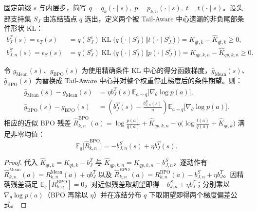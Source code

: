 \documentclass[lang=cn,scheme=chinese,openany]{elegantbook}
\newcommand{\E}{\mathbb E}
\newcommand{\KL}{\operatorname{KL}}
\begin{document}
固定前缀 $s$ 与内层步，简写 $q=q_k(\cdot\mid s),\; p=p_{k,n}(\cdot\mid s),\; t=t(\cdot\mid s)$。设头部支持集 $S_J$ 由冻结锚点 $q$ 选出，定义两个被 Tail-Aware 中心遗漏的非负尾部条件形状 KL：
\begin{align}
 b_J^T(s)=\epsilon_T(s)&=q(S_J^c)\KL\bigl(q(\cdot\mid S_J^c)\Vert t(\cdot\mid S_J^c)\bigr)=K_{qt,k}-\widehat K_{qt,k}\ge 0,\\
 b_{J,n}^S(s)=\epsilon_S(s)&=q(S_J^c)\KL\bigl(q(\cdot\mid S_J^c)\Vert p(\cdot\mid S_J^c)\bigr)=K_{qp,k,n}-\widehat K_{qp,k,n}\ge 0.
\end{align}

\begin{theorem}
\label{thm:ch2-ta-center-gradient-bias}
令 $g_{\mathrm{Mean}}(s)$、$g_{\mathrm{BPO}}(s)$ 为使用精确条件 KL 中心的得分函数梯度，$\widehat g_{\mathrm{Mean}}(s)$、$\widehat g_{\mathrm{BPO}}(s)$ 为替换成 Tail-Aware 中心并对整个权重停止梯度后的条件期望。则：
\begin{align}
 \widehat g_{\mathrm{Mean}}(s)-g_{\mathrm{Mean}}(s)
 &=\eta b_J^T(s)\mathbb E_{a\sim q}\bigl[\nabla_\theta\log p(a)\bigr],\\
 \widehat g_{\mathrm{BPO}}(s)-g_{\mathrm{BPO}}(s)
 &=\left(b_J^T(s)-\frac{b_{J,n}^S(s)}{\eta}\right)
   \mathbb E_{a\sim q}\bigl[\nabla_\theta\log p(a)\bigr].
\end{align}
相应的近似 BPO 残差 $\widehat R_{k,n}^{\mathrm{BPO}}(a)=\log\frac{p(a)}{q(a)}+\widehat K_{qp,k,n}-\eta\bigl(\log\frac{t(a)}{q(a)}+\widehat K_{qt,k}\bigr)$ 满足非零均值：
\begin{equation}
 \mathbb E_q\bigl[\widehat R_{k,n}^{\mathrm{BPO}}\bigr]=-b_{J,n}^S(s)+\eta b_J^T(s).
\end{equation}
\end{theorem}
\begin{proof}
代入 $\widehat K_{qt,k}=K_{qt,k}-b_J^T$ 与 $\widehat K_{qp,k,n}=K_{qp,k,n}-b_{J,n}^S$，逐动作有 $\widehat R_{k,n}^{\mathrm{Mean}}(a)=R_{k,n}^{\mathrm{Mean}}(a)+\eta b_J^T$ 以及 $\widehat R_{k,n}^{\mathrm{BPO}}(a)=R_{k,n}^{\mathrm{BPO}}(a)-b_{J,n}^S+\eta b_J^T$。因精确残差满足 $\E_q[R_{k,n}^{\mathrm{BPO}}]=0$，对近似残差取期望即得 $-b_{J,n}^S+\eta b_J^T$；分别乘以 $\nabla_\theta\log p(a)$（BPO 再除以 $\eta$）并在冻结分布 $q$ 下取期望即得两个梯度偏差公式。
\end{proof}
\end{document}
